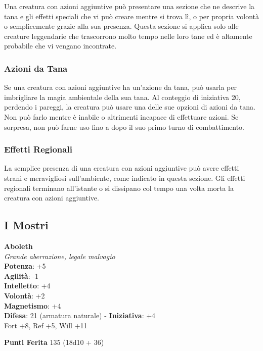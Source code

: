 \begin{multicols}{2}
Una creatura con azioni aggiuntive può presentare una sezione che ne descrive la tana e gli effetti speciali che vi può  creare mentre si trova lì, o per propria volontà o  semplicemente grazie alla sua presenza. Questa  sezione si applica solo alle creature leggendarie che  trascorrono molto tempo nelle loro tane ed è altamente  probabile che vi vengano incontrate.

\subsubsection{Azioni da Tana}

Se una creatura con azioni aggiuntive ha un'azione da tana, può  usarla per imbrigliare la magia ambientale della sua  tana. Al conteggio di iniziativa 20, perdendo i pareggi,  la creatura può usare una delle sue opzioni di azioni da  tana. Non può farlo mentre è inabile o altrimenti  incapace di effettuare azioni. Se sorpresa, non può  farne uso fino a dopo il suo primo turno di combattimento.

\subsubsection{Effetti Regionali}

La semplice presenza di una creatura con azioni aggiuntive può  avere effetti strani e meravigliosi sull'ambiente, come  indicato in questa sezione. Gli effetti regionali terminano all'istante o si dissipano col tempo una volta  morta la creatura con azioni aggiuntive.

\subsection{I Mostri}

\pagebreak

\textbf{Aboleth}\\
\emph{Grande aberrazione, legale malvagio}\\
\textbf{Potenza}: +5\\
\textbf{Agilità}: -1\\
\textbf{Intelletto}: +4\\
\textbf{Volontà}: +2\\
\textbf{Magnetismo}: +4\\
\textbf{Difesa}: 21 (armatura naturale) - \textbf{Iniziativa}: +4\\
Fort +8, Ref +5, Will +11

\textbf{Punti Ferita} 135 (18d10 + 36)


\end{multicols}
